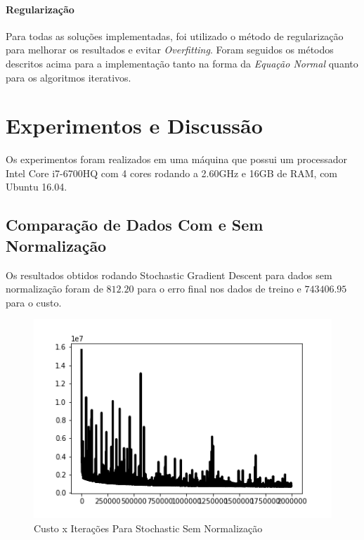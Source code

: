 \documentclass[conference]{IEEEtran}
\begin{document}
\paragraph{Regularização}

Para todas as soluções implementadas, foi utilizado o método de regularização para melhorar os resultados e evitar \textit{Overfitting}. Foram seguidos os métodos descritos acima para a implementação tanto na forma da \textit{Equação Normal} quanto para os algoritmos iterativos.

\section{Experimentos e Discussão}

Os experimentos foram realizados em uma máquina que possui um processador Intel Core i7-6700HQ com 4 cores rodando a 2.60GHz e 16GB de RAM, com Ubuntu 16.04.

\subsection{Comparação de Dados Com e Sem Normalização}

Os resultados obtidos rodando Stochastic Gradient Descent para dados sem normalização foram de $812.20$ para o erro final nos dados de treino e $743406.95$ para o custo.

\begin{figure}[H]
  \includegraphics[width=\linewidth]{gfx/S_costitr_mitr2000000_nonnormalized.png}
  \caption{Custo x Iterações Para Stochastic Sem Normalização}
  \label{fig:not_normalized}
\end{figure}
\end{document}
